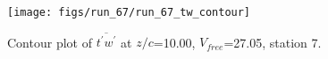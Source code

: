 \begin{figure}[H]
\centering
\texttt{[image: figs/run\_67/run\_67\_tw\_contour]}
\caption{Contour plot of $\overline{t^\prime w^\prime}$ at $z/c$=10.00, $V_{free}$=27.05, station 7.}
\label{fig:run_67_tw_contour}
\end{figure}


